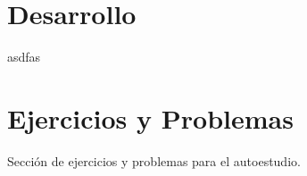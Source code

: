 \section{Desarrollo}

\begin{section-theorem.tcb}
    asdfas
\end{section-theorem.tcb}

\section{Ejercicios y Problemas}
{
    Sección de ejercicios y problemas para el autoestudio.
}